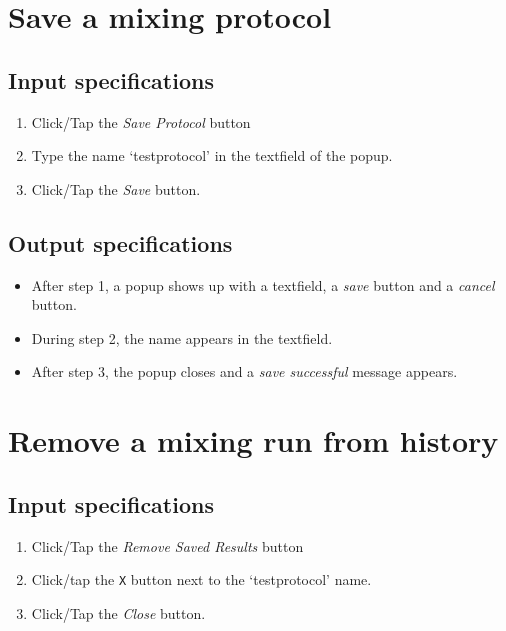 \section{Save a mixing protocol}

\subsection*{Input specifications}
\begin{enumerate}
\item Click/Tap the \emph{Save Protocol} button
\item Type the name `testprotocol' in the textfield of the popup.
\item Click/Tap the \emph{Save} button.
\end{enumerate}

\subsection*{Output specifications}
\begin{itemize}
\item After step 1, a popup shows up with a textfield, a \emph{save} button and a \emph{cancel} button.
\item During step 2, the name appears in the textfield.
\item After step 3, the popup closes and a \emph{save successful} message appears.
\end{itemize}
 
\section{Remove a mixing run from history}

\subsection*{Input specifications}
\begin{enumerate}
\item Click/Tap the \emph{Remove Saved Results} button
\item Click/tap the \texttt{X} button next to the `testprotocol' name.
\item Click/Tap the \emph{Close} button.
\end{enumerate}

